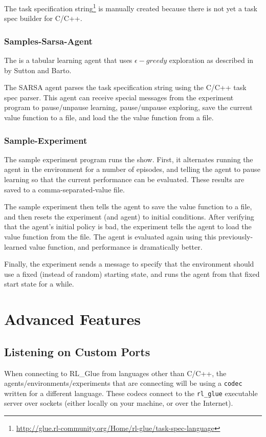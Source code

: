 \documentclass[11pt]{article}
\begin{document}
The task specification string\footnote{\url{http://glue.rl-community.org/Home/rl-glue/task-spec-language}} is manually created because there is not yet a task spec builder for C/C++. 

\subsubsection{Samples-Sarsa-Agent}
\label{sarsa-sample}
The 
is a tabular learning agent that uses $\epsilon-greedy$ exploration as described in  by Sutton and Barto.

The SARSA agent parses the task specification string using the C/C++ task spec parser.  This agent can receive special messages from the experiment program to pause/unpause learning, pause/unpause exploring, save the current value function to a file, and load the the value function from a file.

\subsubsection{Sample-Experiment}
The sample experiment program runs the show.  First, it alternates running the agent in the environment for a number of episodes, and telling the agent to pause learning so that the current performance can be evaluated.  These results are saved to a comma-separated-value file.

The sample experiment then tells the agent to save the value function to a file, and then resets the experiment (and agent) to initial conditions.  After verifying that the agent's initial policy is bad, the experiment tells the agent to load the value function from the file.  The agent is evaluated again using this previously-learned value function, and performance is dramatically better.

Finally, the experiment sends a message to specify that the environment should use a fixed (instead of random) starting state, and runs the agent from that fixed start state for a while.

\section{Advanced Features}
\subsection{Listening on Custom Ports}
When connecting to RL\_Glue from languages other than C/C++, the agents/environments/experiments that are connecting will be using a \texttt{codec} written for a different language.  These codecs connect to the \texttt{rl\_glue} executable server over sockets (either locally on your machine, or over the Internet).
\end{document}

